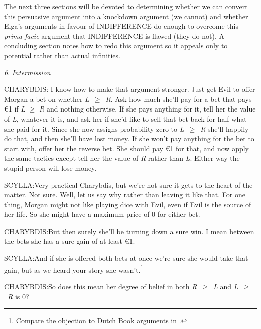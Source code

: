 The next three sections will be devoted to determining whether we can convert this persuasive argument into a knockdown argument (we cannot) and whether Elga's arguments in favour of INDIFFERENCE do enough to overcome this \textit{prima facie} argument that INDIFFERENCE is flawed (they do not). A concluding section notes how to redo this argument so it appeals only to potential rather than actual infinities.


\textit{6}. \textit{Intermission}

\begin{hangparas}{.25in}{1}
CHARYBDIS: I know how to make that argument stronger. Just get Evil to offer Morgan a bet on whether \textit{L}~${\geq}$~\textit{R}. Ask how much she'll pay for a bet that pays {\euro}1 if \textit{L} ${\geq}$ \textit{R} and nothing otherwise. If she pays anything for it, tell her the value of \textit{L}, whatever it is, and ask her if she'd like to sell that bet back for half what she paid for it. Since she now assigns probability zero to \textit{L}~${\geq}$~\textit{R} she'll happily do that, and then she'll have lost money. If she won't pay anything for the bet to start with, offer her the reverse bet. She should pay {\euro}1 for that, and now apply the same tactics except tell her the value of \textit{R} rather than \textit{L}. Either way the stupid person will lose money.

SCYLLA:Very practical Charybdis, but we're not sure it gets to the heart of the matter. Not sure. Well, let us say why rather than leaving it like that. For one thing, Morgan might not like playing dice with Evil, even if Evil is the source of her life. So she might have a maximum price of 0 for either bet.

CHARYBDIS:But then surely she'll be turning down a sure win. I mean between the bets she has a sure gain of at least {\euro}1.

SCYLLA:And if she is offered both bets at once we're sure she would take that gain, but as we heard your story she wasn't.\footnote{Compare the objection to Dutch Book arguments in \citet{Schick1986}.}

CHARYBDIS:So does this mean her degree of belief in both \textit{R}~${\geq}$~\textit{L} and \textit{L}~${\geq}$~\textit{R} is 0?


\end{hangparas}
